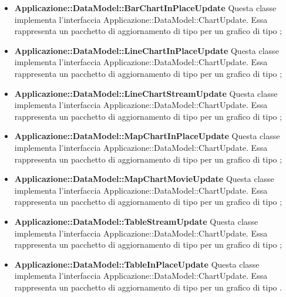 \begin{itemize}
		\item \textbf{Applicazione::DataModel::BarChartInPlaceUpdate} Questa classe implementa l'interfaccia Applicazione::DataModel::ChartUpdate. Essa rappresenta un pacchetto di aggiornamento di tipo  per un grafico di tipo ;

		\item \textbf{Applicazione::DataModel::LineChartInPlaceUpdate} Questa classe implementa l'interfaccia Applicazione::DataModel::ChartUpdate. Essa rappresenta un pacchetto di aggiornamento di tipo  per un grafico di tipo ;

		\item \textbf{Applicazione::DataModel::LineChartStreamUpdate} Questa classe implementa l'interfaccia Applicazione::DataModel::ChartUpdate. Essa rappresenta un pacchetto di aggiornamento di tipo  per un grafico di tipo ;

		\item \textbf{Applicazione::DataModel::MapChartInPlaceUpdate} Questa classe implementa l'interfaccia Applicazione::DataModel::ChartUpdate. Essa rappresenta un pacchetto di aggiornamento di tipo  per un grafico di tipo ;

		\item \textbf{Applicazione::DataModel::MapChartMovieUpdate} Questa classe implementa l'interfaccia Applicazione::DataModel::ChartUpdate. Essa rappresenta un pacchetto di aggiornamento di tipo  per un grafico di tipo ;

		\item \textbf{Applicazione::DataModel::TableStreamUpdate} Questa classe implementa l'interfaccia Applicazione::DataModel::ChartUpdate. Essa rappresenta un pacchetto di aggiornamento di tipo  per un grafico di tipo ;

		\item \textbf{Applicazione::DataModel::TableInPlaceUpdate} Questa classe implementa l'interfaccia Applicazione::DataModel::ChartUpdate. Essa rappresenta un pacchetto di aggiornamento di tipo  per un grafico di tipo .
	\end{itemize}
